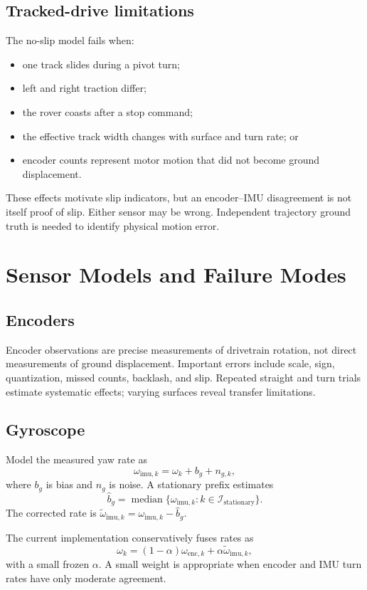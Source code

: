 \documentclass[11pt,oneside]{book}
\begin{document}
\section{Tracked-drive limitations}

The no-slip model fails when:
\begin{itemize}
  \item one track slides during a pivot turn;
  \item left and right traction differ;
  \item the rover coasts after a stop command;
  \item the effective track width changes with surface and turn rate; or
  \item encoder counts represent motor motion that did not become ground
  displacement.
\end{itemize}

These effects motivate slip indicators, but an encoder--IMU disagreement is
not itself proof of slip. Either sensor may be wrong. Independent trajectory
ground truth is needed to identify physical motion error.

\chapter{Sensor Models and Failure Modes}

\section{Encoders}

Encoder observations are precise measurements of drivetrain rotation, not
direct measurements of ground displacement. Important errors include scale,
sign, quantization, missed counts, backlash, and slip. Repeated straight and
turn trials estimate systematic effects; varying surfaces reveal transfer
limitations.

\section{Gyroscope}

Model the measured yaw rate as
\[
\omega_{\mathrm{imu},k}=\omega_k+b_g+n_{g,k},
\]
where $b_g$ is bias and $n_g$ is noise. A stationary prefix estimates
\[
\hat b_g=\operatorname{median}
\{\omega_{\mathrm{imu},k}:k\in\mathcal{I}_{\mathrm{stationary}}\}.
\]
The corrected rate is $\tilde\omega_{\mathrm{imu},k}
=\omega_{\mathrm{imu},k}-\hat b_g$.

The current implementation conservatively fuses rates as
\[
\omega_k=(1-\alpha)\omega_{\mathrm{enc},k}
+\alpha\tilde\omega_{\mathrm{imu},k},
\]
with a small frozen $\alpha$. A small weight is appropriate when encoder and
IMU turn rates have only moderate agreement.
\end{document}
